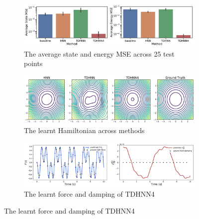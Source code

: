 \documentclass{article}
\begin{document}
\begin{figure}[!htb]
\begin{subfigure}[b]{0.48\textwidth}
\includegraphics[width=\textwidth]{figures/figures/forced_mass_spring/2/forced_mass_spring_errors_0.pdf}
\caption{The average state and energy MSE across 25 test points}
\end{subfigure}
\begin{subfigure}[b]{0.48\textwidth}
\includegraphics[width=\textwidth]{figures/figures/forced_mass_spring/2/forced_mass_spring_hamiltonian_0.pdf}
\caption{The learnt Hamiltonian across methods}
\end{subfigure}
\begin{subfigure}[b]{0.48\textwidth}
\includegraphics[width=\textwidth]{figures/figures/forced_mass_spring/2/forced_mass_spring_dpdt_new_0.pdf}
\caption{The learnt force and damping of TDHNN4}
\end{subfigure}
\label{forced_mpsring_2_full}
\end{figure}
\end{document}
